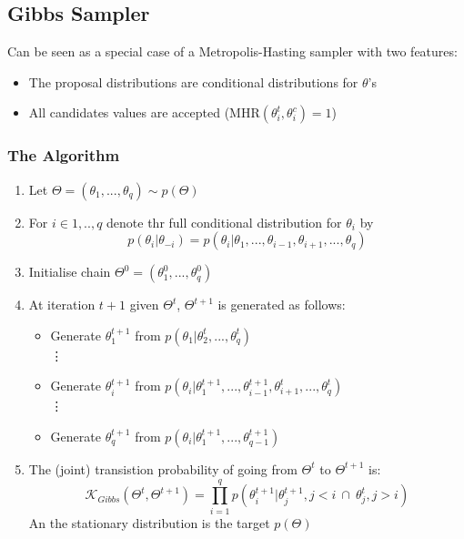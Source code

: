 \documentclass[12pt]{article}
\theoremstyle{definition}
\begin{document}
    \subsection*{Gibbs Sampler}
    Can be seen as a special case of a Metropolis-Hasting sampler with two features:
    \begin{itemize}
        \item The proposal distributions are conditional distributions for $\theta$'s
        \item All candidates values are accepted (MHR$(\theta_i^t,\theta_i^c) = 1$)
    \end{itemize}
        \subsubsection*{The Algorithm}
        \begin{enumerate}
            \item Let $\Theta = (\theta_1,...,\theta_q) \sim p(\Theta)$
            \item For $i \in 1,..,q$ denote thr full conditional distribution for $\theta_i$ by
                $$p(\theta_i|\theta_{-i}) = p(\theta_i|\theta_1,...,\theta_{i-1}, \theta_{i+1},...,\theta_q)$$
            \item Initialise chain $\Theta^0 = (\theta_1^0,...,\theta_q^0)$
            \item At iteration $t+1$ given $\Theta^{t}$, $\Theta^{t+1}$ is generated as follows:
                \begin{itemize}[topsep = 0px]
                    \item Generate $\theta_1^{t+1}$ from $p(\theta_1|\theta_2^{t},...,\theta_q^{t})$
                    \\ \vdots
                    \item Generate $\theta_i^{t+1}$ from $p(\theta_i|\theta_1^{t+1},...,\theta_{i-1}^{t+1},\theta_{i+1}^{t},...,\theta_q^{t})$
                    \\ \vdots
                    \item Generate $\theta_q^{t+1}$ from $p(\theta_i|\theta_1^{t+1},...,\theta_{q-1}^{t+1})$
                \end{itemize}
            \item The (joint) transistion probability of going from $\Theta^t$ to $\Theta^{t+1}$ is:
                $$\mathcal{K}_{Gibbs}(\Theta^t,\Theta^{t+1}) = \prod_{i=1}^q p(\theta_i^{t+1}|\theta_j^{t+1}, j < i\ \cap\ \theta_j^{t}, j >i )$$
                An the stationary distribution is the target $p(\Theta)$
        \end{enumerate}
\end{document}

